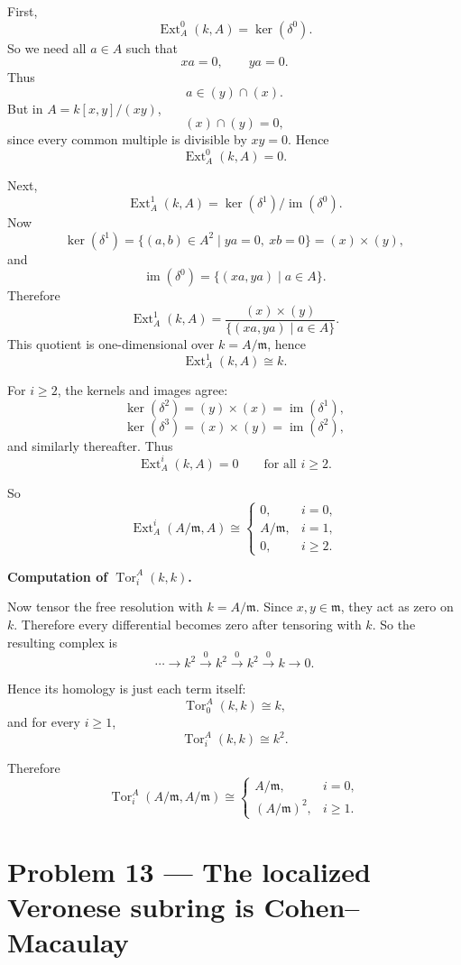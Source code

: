 \documentclass[12pt,a4paper]{article}
\theoremstyle{notespace}
\begin{document}
First,
\[
\operatorname{Ext}_A^0(k,A)=\ker(\delta^0).
\]
So we need all \(a\in A\) such that
\[
xa=0,\qquad ya=0.
\]
Thus
\[
a\in (y)\cap (x).
\]
But in \(A=k[x,y]/(xy)\),
\[
(x)\cap (y)=0,
\]
since every common multiple is divisible by \(xy=0\). Hence
\[
\operatorname{Ext}_A^0(k,A)=0.
\]

Next,
\[
\operatorname{Ext}_A^1(k,A)=\ker(\delta^1)/\operatorname{im}(\delta^0).
\]
Now
\[
\ker(\delta^1)=\{(a,b)\in A^2\mid ya=0,\ xb=0\}=(x)\times (y),
\]
and
\[
\operatorname{im}(\delta^0)=\{(xa,ya)\mid a\in A\}.
\]
Therefore
\[
\operatorname{Ext}_A^1(k,A)
=
\frac{(x)\times (y)}{\{(xa,ya)\mid a\in A\}}.
\]
This quotient is one-dimensional over \(k=A/\mathfrak m\), hence
\[
\operatorname{Ext}_A^1(k,A)\cong k.
\]

For \(i\ge 2\), the kernels and images agree:
\[
\ker(\delta^2)=(y)\times (x)=\operatorname{im}(\delta^1),
\]
\[
\ker(\delta^3)=(x)\times (y)=\operatorname{im}(\delta^2),
\]
and similarly thereafter. Thus
\[
\operatorname{Ext}_A^i(k,A)=0
\qquad\text{for all }i\ge 2.
\]

So
\[
\operatorname{Ext}_A^i(A/\mathfrak m,A)\cong
\begin{cases}
	0,& i=0,\\[1mm]
	A/\mathfrak m,& i=1,\\[1mm]
	0,& i\ge 2.
\end{cases}
\]

\medskip

\textbf{Computation of \(\operatorname{Tor}_i^A(k,k)\).}

Now tensor the free resolution with \(k=A/\mathfrak m\). Since \(x,y\in \mathfrak m\), they act as zero on \(k\). Therefore every differential becomes zero after tensoring with \(k\). So the resulting complex is
\[
\cdots \to k^2 \xrightarrow{0} k^2 \xrightarrow{0} k^2 \xrightarrow{0} k \to 0.
\]

Hence its homology is just each term itself:
\[
\operatorname{Tor}_0^A(k,k)\cong k,
\]
and for every \(i\ge 1\),
\[
\operatorname{Tor}_i^A(k,k)\cong k^2.
\]

Therefore
\[
\operatorname{Tor}_i^A(A/\mathfrak m,A/\mathfrak m)\cong
\begin{cases}
	A/\mathfrak m,& i=0,\\[1mm]
	(A/\mathfrak m)^2,& i\ge 1.
\end{cases}
\]

\section{Problem 13 --- The localized Veronese subring is Cohen--Macaulay}
\end{document}
